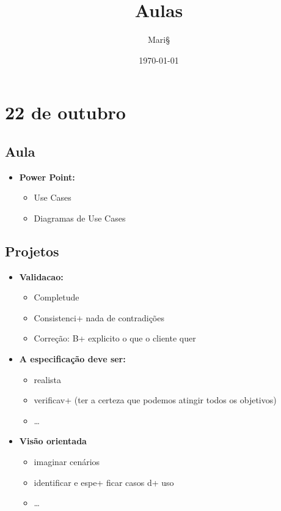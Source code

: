 \documentclass[11pt]{article}
\author{Mari§}
\date{\today}
\title{Aulas}
\begin{document}
\maketitle
\tableofcontents


\section{22 de outubro}
\label{sec:orgd6f13fb}
\subsection{Aula}
\label{sec:org092b33f}
\begin{itemize}
\item \textbf{Power Point:}
\begin{itemize}
\item Use Cases
\item Diagramas de Use Cases
\end{itemize}
\end{itemize}

\subsection{Projetos}
\label{sec:orgbffc1ec}
\begin{itemize}
\item \textbf{Validacao:}
\begin{itemize}
\item Completude
\item Consistenci+  nada de contradições
\item Correção: B+  explicito o que o cliente quer
\end{itemize}
\end{itemize}


\begin{itemize}
\item \textbf{A especificação deve ser:}
\begin{itemize}
\item realista
\item verificav+  (ter a certeza que podemos atingir todos os objetivos)
\item \ldots{}
\end{itemize}

\item \textbf{Visão  orientada}
\begin{itemize}
\item imaginar cenários
\item identificar e espe+ ficar casos d+ uso
\item \ldots{}
\end{itemize}
\end{itemize}
\end{document}
